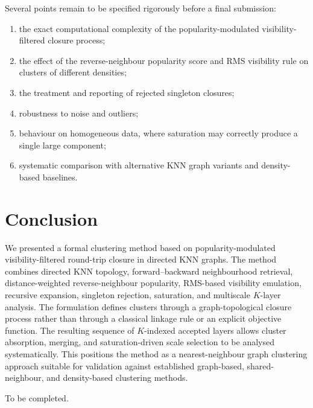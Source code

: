 \documentclass[pdflatex,sn-mathphys-num]{sn-jnl}
\begin{document}
Several points remain to be specified rigorously before a final submission:
\begin{enumerate}
    \item the exact computational complexity of the popularity-modulated visibility-filtered closure process;
    \item the effect of the reverse-neighbour popularity score and RMS visibility rule on clusters of different densities;
    \item the treatment and reporting of rejected singleton closures;
    \item robustness to noise and outliers;
    \item behaviour on homogeneous data, where saturation may correctly produce a single large component;
    \item systematic comparison with alternative KNN graph variants and density-based baselines.
\end{enumerate}

\section{Conclusion}\label{sec:conclusion}

We presented a formal clustering method based on popularity-modulated visibility-filtered round-trip closure in directed KNN graphs. The method combines directed KNN topology, forward--backward neighbourhood retrieval, distance-weighted reverse-neighbour popularity, RMS-based visibility emulation, recursive expansion, singleton rejection, saturation, and multiscale $K$-layer analysis. The formulation defines clusters through a graph-topological closure process rather than through a classical linkage rule or an explicit objective function. The resulting sequence of $K$-indexed accepted layers allows cluster absorption, merging, and saturation-driven scale selection to be analysed systematically. This positions the method as a nearest-neighbour graph clustering approach suitable for validation against established graph-based, shared-neighbour, and density-based clustering methods.

\backmatter

\backmatter

{\color{red}
To be completed.
}
\end{document}
